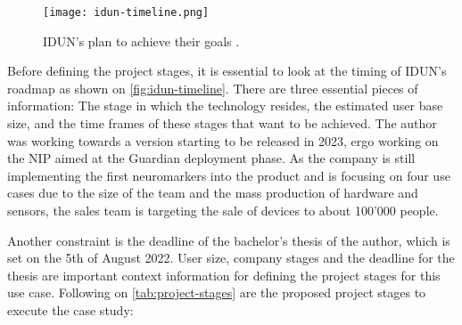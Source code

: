 \begin{figure}[!ht]
  \centering
  \texttt{[image: idun-timeline.png]}
  \caption{IDUN's plan to achieve their goals \citep{idun_guardian_nodate}.}
  \label{fig:idun-timeline}
\end{figure}

Before defining the project stages, it is essential to look at the timing of IDUN's roadmap as shown on \autoref{fig:idun-timeline}. There are three essential pieces of information: The stage in which the technology resides, the estimated user base size, and the time frames of these stages that want to be achieved. The author was working towards a version starting to be released in 2023, ergo working on the NIP aimed at the Guardian deployment phase. As the company is still implementing the first neuromarkers into the product and is focusing on four use cases due to the size of the team and the mass production of hardware and sensors, the sales team is targeting the sale of devices to about 100'000 people.

Another constraint is the deadline of the bachelor's thesis of the author, which is set on the 5th of August 2022. User size, company stages and the deadline for the thesis are important context information for defining the project stages for this use case. Following on \autoref{tab:project-stages} are the proposed project stages to execute the case study:

